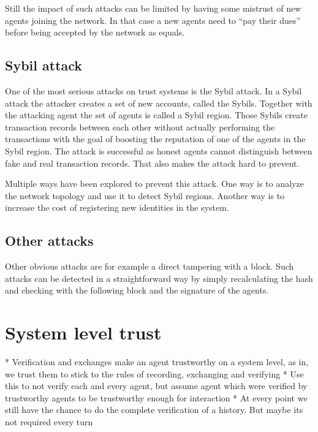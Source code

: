 Still the impact of such attacks can be limited by having some mistrust of new agents joining the 
network. In that case a new agents need to ``pay their dues'' before being accepted by the network 
as equals.

\subsection{Sybil attack}
One of the most serious attacks on trust systems is the Sybil attack. In a Sybil attack the attacker
creates a set of new accounts, called the Sybils. Together with the attacking agent the set of 
agents is called a Sybil region. Those Sybils create transaction records 
between each other without actually performing the transactions with the goal of boosting the 
reputation of one of the agents in the Sybil region. The attack is successful as honest agents 
cannot distinguish between fake and real transaction records. That also makes the attack hard to 
prevent.

Multiple ways have been explored to prevent this attack. One way is to analyze the network topology
and use it to detect Sybil regions. Another way is to increase the cost of registering new identities
in the system. 

\subsection{Other attacks}
Other obvious attacks are for example a direct tampering with a block. Such attacks can be 
detected in a straightforward way by simply recalculating the hash and checking with the following 
block and the signature of the agents.


\section{System level trust}
* Verification and exchanges make an agent trustworthy on a system level, as in, we trust them to 
stick to the rules of recording, exchanging and verifying
* Use this to not verify each and every agent, but assume agent which were verified by trustworthy
agents to be trustworthy enough for interaction
* At every point we still have the chance to do the complete verification of a history. But maybe 
its not required every turn